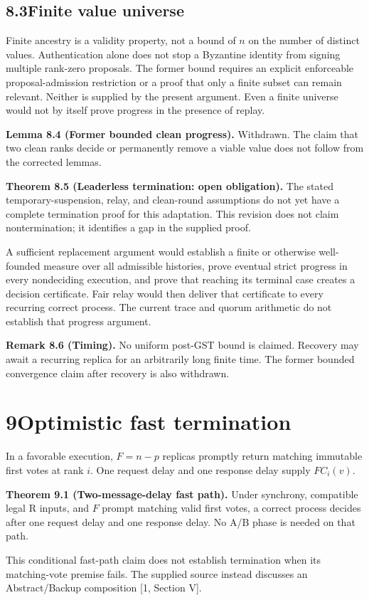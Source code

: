 \documentclass[11pt,a4paper]{article}
\newcommand{\page}[1]{\clearpage\setcounter{page}{#1}}
\newcommand{\claim}[2]{\par\textbf{#1.} #2\par}
\begin{document}
\subsection*{8.3\quad Finite value universe}
Finite ancestry is a validity property, not a bound of $n$ on the number of distinct values. Authentication alone does not stop a Byzantine identity from signing multiple rank-zero proposals. The former bound requires an explicit enforceable proposal-admission restriction or a proof that only a finite subset can remain relevant. Neither is supplied by the present argument. Even a finite universe would not by itself prove progress in the presence of replay.
\page{13}
\claim{Lemma 8.4 (Former bounded clean progress)}{Withdrawn. The claim that two clean ranks decide or permanently remove a viable value does not follow from the corrected lemmas.}
\claim{Theorem 8.5 (Leaderless termination: open obligation)}{The stated temporary-suspension, relay, and clean-round assumptions do not yet have a complete termination proof for this adaptation. This revision does not claim nontermination; it identifies a gap in the supplied proof.}

A sufficient replacement argument would establish a finite or otherwise well-founded measure over all admissible histories, prove eventual strict progress in every nondeciding execution, and prove that reaching its terminal case creates a decision certificate. Fair relay would then deliver that certificate to every recurring correct process. The current trace and quorum arithmetic do not establish that progress argument.
\claim{Remark 8.6 (Timing)}{No uniform post-GST bound is claimed. Recovery may await a recurring replica for an arbitrarily long finite time. The former bounded convergence claim after recovery is also withdrawn.}
\section*{9\quad Optimistic fast termination}
In a favorable execution, $F=n-p$ replicas promptly return matching immutable first votes at rank $i$. One request delay and one response delay supply $FC_i(v)$.
\claim{Theorem 9.1 (Two-message-delay fast path)}{Under synchrony, compatible legal R inputs, and $F$ prompt matching valid first votes, a correct process decides after one request delay and one response delay. No A/B phase is needed on that path.}
This conditional fast-path claim does not establish termination when its matching-vote premise fails. The supplied source instead discusses an Abstract/Backup composition [1, Section V].
\end{document}

